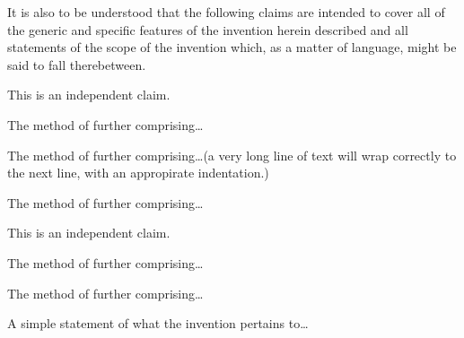 \documentclass[english]{uspatent}
\begin{document}
\patentParagraph It is also to be understood that the following claims are intended to cover all of the generic and specific features of the invention herein described and all statements of the scope of the invention which, as a matter of language, might be said to fall therebetween.

\patentClaimsStart


This is an independent claim.

\dependentClaimsStart


  The method of  further comprising\ldots
  

  The method of  further comprising\ldots (a very long line of text will wrap correctly to the next line, with an appropirate indentation.)


  The method of  further comprising\ldots

\dependentClaimsEnd


This is an independent claim.

\dependentClaimsStart


  The method of  further comprising\ldots


  The method of  further comprising\ldots

\dependentClaimsEnd

\patentClaimsEnd


A simple statement of what the invention pertains to\ldots

\patentDrawings
\end{document}
